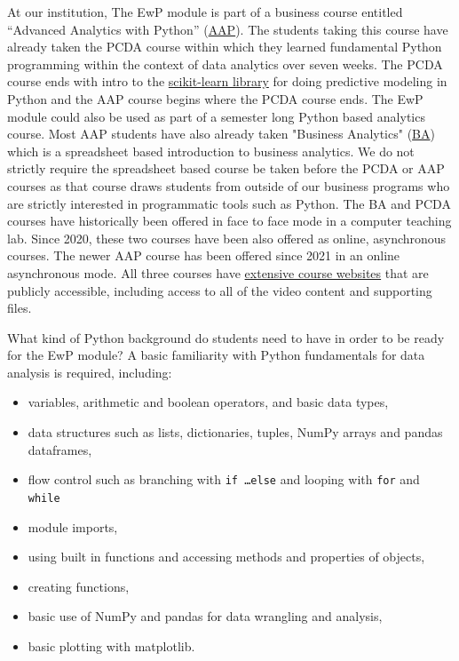\documentclass[ited,blindrev]{informs3}              %
\begin{document}
At our institution, The EwP module is part of a business course entitled ``Advanced Analytics with Python'' (\href{http://www.sba.oakland.edu/faculty/isken/courses/mis6900}{AAP}). The students taking this course have already taken the PCDA course within which they learned fundamental Python programming within the context of data analytics over seven weeks. The PCDA course ends with intro to the \href{https://scikit-learn.org/stable/index.html}{scikit-learn library} for doing predictive modeling in Python and the AAP course begins where the PCDA course ends. The EwP module could also be used as part of a semester long Python based analytics course. Most AAP students have also already taken "Business Analytics" (\href{http://www.sba.oakland.edu/faculty/isken/courses/mis5460}{BA}) which is a spreadsheet based introduction to business analytics. We do not strictly require the spreadsheet based course be taken before the PCDA or AAP courses as that course draws students from outside of our business programs who are strictly interested in programmatic tools such as Python. The BA and PCDA courses have historically been offered in face to face mode in a computer teaching lab. Since 2020, these two courses have been also offered as online, asynchronous courses. The newer AAP course has been offered since 2021 in an online asynchronous mode. All three courses have \href{http://www.sba.oakland.edu/Faculty/isken/teaching.html}{extensive course websites} that are publicly accessible, including access to all of the video content and supporting files. 

What kind of Python background do students need to have in order to be ready for the EwP module? A basic familiarity with Python fundamentals for data analysis is required, including:

\begin{itemize}
	\item variables, arithmetic and boolean operators, and basic data types,
	\item data structures such as lists, dictionaries, tuples, NumPy arrays and pandas dataframes,
	\item flow control such as branching with \texttt{if \ldots else} and looping with \texttt{for} and \texttt{while}
	\item module imports,
	\item using built in functions and accessing methods and properties of objects,
	\item creating functions,
	\item basic use of NumPy and pandas for data wrangling and analysis,
	\item basic plotting with matplotlib.
\end{itemize}
\end{document}
